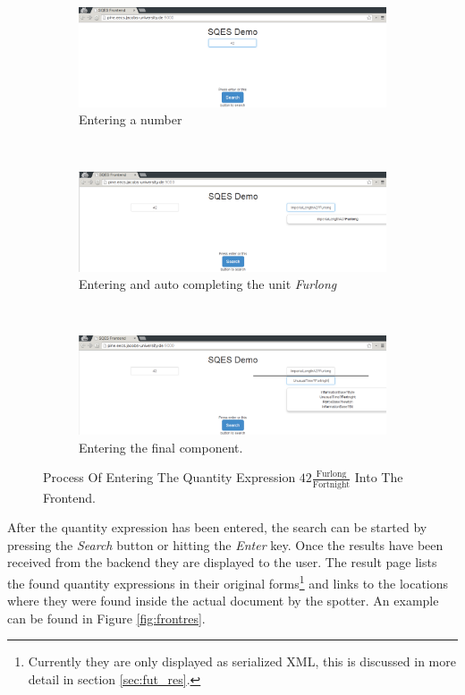 \begin{figure}
  \centering
  \begin{subfigure}[b]{0.9\textwidth}
          \includegraphics[width=\textwidth]{img/enter1}
          \caption{Entering a number}
          \label{fig:frontauto1}
  \end{subfigure}
  \\
  \begin{subfigure}[b]{0.9\textwidth}
          \includegraphics[width=\textwidth]{img/enter2}
          \caption{Entering and auto completing the unit \textit{Furlong}}
          \label{fig:frontauto2}
  \end{subfigure}
  \\
  \begin{subfigure}[b]{0.9\textwidth}
          \includegraphics[width=\textwidth]{img/enter3}
          \caption{Entering the final component. }
          \label{fig:frontauto3}
  \end{subfigure}
  \caption{Process Of Entering The Quantity Expression $42 \frac{\text{Furlong}}{\text{Fortnight}}$ Into The Frontend. }
  \label{fig:frontauto}
\end{figure}

After the quantity expression has been entered, the search can be started by pressing the \textit{Search} button or hitting the \textit{Enter} key. Once the results have been received from the backend they are displayed to the user. The result page lists the found quantity expressions in their original forms\footnote{Currently they are only displayed as serialized XML, this is discussed in more detail in section \ref{sec:fut_res}. } and links to the locations where they were found inside the actual document by the spotter. An example can be found in Figure \ref{fig:frontres}.

